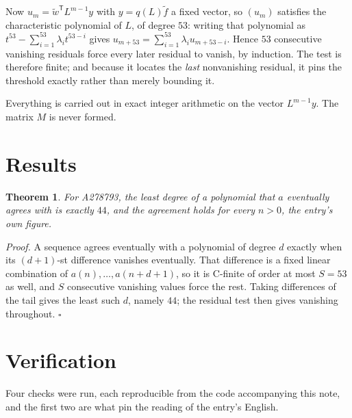 \documentclass[11pt]{article}
\newtheorem{theorem}{Theorem}
\theoremstyle{definition}
\begin{document}
Now $u_m = \tilde w^{\mathsf T} L^{m-1} y$ with $y = q(L)\tilde f$ a fixed vector, so $(u_m)$ satisfies the characteristic polynomial of $L$, of degree $53$: writing that polynomial as $t^{53} - \sum_{i=1}^{53} \lambda_i t^{53-i}$ gives $u_{m+53} = \sum_{i=1}^{53} \lambda_i u_{m+53-i}$. Hence $53$ consecutive vanishing residuals force every later residual to vanish, by induction. The test is therefore finite; and because it locates the {\itshape last} nonvanishing residual, it pins the threshold exactly rather than merely bounding it.

Everything is carried out in exact integer arithmetic on the vector $L^{m-1}y$. The matrix $M$ is never formed.

\section{Results}

\begin{theorem} For A278793, the least degree of a polynomial that $a$ eventually agrees with is exactly $44$, and the agreement holds for every $n > 0$, the entry's own figure.\end{theorem}

{\itshape Proof.} A sequence agrees eventually with a polynomial of degree $d$ exactly when its $(d+1)$-st difference vanishes eventually. That difference is a fixed linear combination of $a(n),\dots,a(n+d+1)$, so it is C-finite of order at most $S = 53$ as well, and $S$ consecutive vanishing values force the rest. Taking differences of the tail gives the least such $d$, namely $44$; the residual test then gives vanishing throughout. $\square$

\section{Verification}

Four checks were run, each reproducible from the code accompanying this note, and the first two are what pin the reading of the entry's English.
\end{document}
